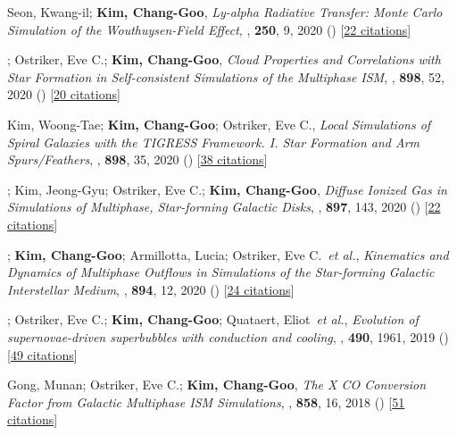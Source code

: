 \item[{16.}]Seon, Kwang-il; \textbf{Kim, Chang-Goo}, \textit{Ly-alpha Radiative Transfer: Monte Carlo Simulation of the Wouthuysen-Field Effect}, , \textbf{250}, 9, 2020 () [\href{http://adsabs.harvard.edu/abs/2020ApJS..250....9S}{22 citations}]

\item[{15.}]; Ostriker, Eve C.; \textbf{Kim, Chang-Goo}, \textit{Cloud Properties and Correlations with Star Formation in Self-consistent Simulations of the Multiphase ISM}, , \textbf{898}, 52, 2020 () [\href{http://adsabs.harvard.edu/abs/2020ApJ...898...52M}{20 citations}]

\item[{14.}]Kim, Woong-Tae; \textbf{Kim, Chang-Goo}; Ostriker, Eve C., \textit{Local Simulations of Spiral Galaxies with the TIGRESS Framework. I. Star Formation and Arm Spurs/Feathers}, , \textbf{898}, 35, 2020 () [\href{http://adsabs.harvard.edu/abs/2020ApJ...898...35K}{38 citations}]

\item[{13.}]; Kim, Jeong-Gyu; Ostriker, Eve C.; \textbf{Kim, Chang-Goo}, \textit{Diffuse Ionized Gas in Simulations of Multiphase, Star-forming Galactic Disks}, , \textbf{897}, 143, 2020 () [\href{http://adsabs.harvard.edu/abs/2020ApJ...897..143K}{22 citations}]

\item[{12.}]; \textbf{Kim, Chang-Goo}; Armillotta, Lucia; Ostriker, Eve C.~\textit{et al.}, \textit{Kinematics and Dynamics of Multiphase Outflows in Simulations of the Star-forming Galactic Interstellar Medium}, , \textbf{894}, 12, 2020 () [\href{http://adsabs.harvard.edu/abs/2020ApJ...894...12V}{24 citations}]

\item[{11.}]; Ostriker, Eve C.; \textbf{Kim, Chang-Goo}; Quataert, Eliot~\textit{et al.}, \textit{Evolution of supernovae-driven superbubbles with conduction and cooling}, , \textbf{490}, 1961, 2019 () [\href{http://adsabs.harvard.edu/abs/2019MNRAS.490.1961E}{49 citations}]

\item[{10.}]Gong, Munan; Ostriker, Eve C.; \textbf{Kim, Chang-Goo}, \textit{The X CO Conversion Factor from Galactic Multiphase ISM Simulations}, , \textbf{858}, 16, 2018 () [\href{http://adsabs.harvard.edu/abs/2018ApJ...858...16G}{51 citations}]